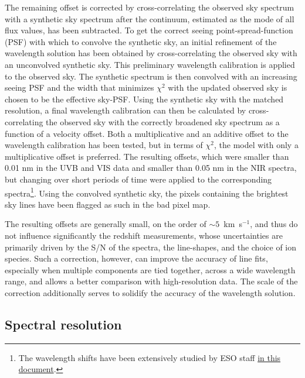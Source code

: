 \documentclass[longauth]{aa}    %
\begin{document}
The remaining offset is corrected by cross-correlating the observed sky spectrum
with a synthetic sky spectrum \citep{Noll2012, Jones2013} after the continuum,
estimated as the mode of all flux values, has been subtracted. To get the
correct seeing point-spread-function (PSF) with which to convolve the synthetic
sky, an initial refinement of the wavelength solution has been obtained by
cross-correlating the observed sky with an unconvolved synthetic sky. This
preliminary wavelength calibration is applied to the observed sky. The synthetic
spectrum is then convolved with an increasing seeing PSF and the width that
minimizes $\chi^2$ with the updated observed sky is chosen to be the effective
sky-PSF. Using the synthetic sky with the matched resolution, a final wavelength
calibration can then be calculated by cross-correlating the observed sky with
the correctly broadened sky spectrum as a function of a velocity offset. Both a
multiplicative and an additive offset to the wavelength calibration has been
tested, but in terms of $\chi^2$, the model with only a multiplicative offset is
preferred. The resulting offsets, which were smaller than 0.01 nm in the UVB and
VIS data and smaller than 0.05 nm in the NIR spectra, but changing over short
periods of time were applied to the corresponding spectra\footnote{The
	wavelength shifts have been extensively studied by ESO staff
	\href{https://www.eso.org/sci/facilities/paranal/instruments/xshooter/doc/XS_wlc_shift_150615.pdf}{in
		this document}.}. Using the convolved synthetic sky, the pixels containing the
brightest sky lines have been flagged as such in the bad pixel map.

The resulting offsets are generally small, on the order of $\sim 5$~km~s$^{-1}$,
and thus do not influence significantly the redshift measurements, whose
uncertainties are primarily driven by the S/N of the spectra, the line-shapes,
and the choice of ion species. Such a correction, however, can improve the
accuracy of line fits, especially when multiple components are tied together,
across a wide wavelength range, and allows a better comparison with
high-resolution data. The scale of the correction additionally serves to
solidify the accuracy of the wavelength solution. 


\subsection{Spectral resolution} \label{resolution}
\end{document}
